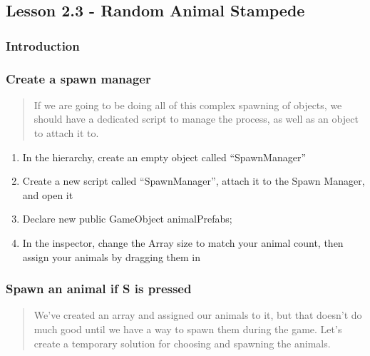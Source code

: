 \documentclass[
]{book}
\providecommand{\tightlist}{%
  \setlength{\itemsep}{0pt}\setlength{\parskip}{0pt}}
\begin{document}
\hypertarget{lesson-2.3---random-animal-stampede}{%
\subsection{Lesson 2.3 - Random Animal Stampede}\label{lesson-2.3---random-animal-stampede}}

\hypertarget{introduction-2}{%
\subsubsection{Introduction}\label{introduction-2}}

\hypertarget{create-a-spawn-manager}{%
\subsubsection{Create a spawn manager}\label{create-a-spawn-manager}}

\begin{quote}
If we are going to be doing all of this complex spawning of objects, we should have a dedicated script to manage the process, as well as an object to attach it to.
\end{quote}

\begin{enumerate}
\def\labelenumi{\arabic{enumi}.}
\tightlist
\item
  In the hierarchy, create an empty object called ``SpawnManager''
\item
  Create a new script called ``SpawnManager'', attach it to the Spawn Manager, and open it
\item
  Declare new public GameObject\protect\hyperlink{section}{} animalPrefabs;
\item
  In the inspector, change the Array size to match your animal count, then assign your animals by dragging them in
\end{enumerate}

\hypertarget{spawn-an-animal-if-s-is-pressed}{%
\subsubsection{Spawn an animal if S is pressed}\label{spawn-an-animal-if-s-is-pressed}}

\begin{quote}
We've created an array and assigned our animals to it, but that doesn't do much good until we have a way to spawn them during the game. Let's create a temporary solution for choosing and spawning the animals.
\end{quote}
\end{document}
